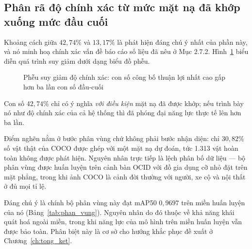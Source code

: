 \subsection{Phân rã độ chính xác từ mức mặt nạ đã khớp xuống mức đầu cuối}

Khoảng cách giữa $42{,}74\%$ và $13{,}17\%$ là phát hiện đáng chú ý nhất của phần này, và nó
minh hoạ chính xác vấn đề báo cáo số liệu đã nêu ở Mục 2.7.2. Hình~\ref{fig:phieu} biểu diễn
quá trình suy giảm dưới dạng biểu đồ phễu.

\begin{figure}[H]
\centering
{}
\caption{Phễu suy giảm độ chính xác: con số công bố thuận lợi nhất cao gấp hơn ba lần con số
đầu-cuối}
\label{fig:phieu}
\end{figure}

Con số $42{,}74\%$ chỉ có ý nghĩa \emph{với điều kiện} mặt nạ đã được khớp; nếu trình bày nó như
độ chính xác của cả hệ thống thì đã phóng đại năng lực thực tế lên hơn ba lần.

Điểm nghẽn nằm ở bước phân vùng chứ không phải bước nhận diện: chỉ $30{,}82\%$ số vật thật của
COCO được ghép với một mặt nạ dự đoán, tức 1.313 vật hoàn toàn không được phát hiện. Nguyên nhân
trực tiếp là lệch phân bố dữ liệu --- bộ phân vùng được huấn luyện trên cảnh bàn OCID với đồ gia
dụng cỡ nhỏ đặt trên mặt phẳng, trong khi ảnh COCO là cảnh đời thường với người, xe cộ và nội
thất ở đủ mọi tỉ lệ.

Đáng chú ý là chính bộ phân vùng này đạt mAP50 $0{,}9697$ trên miền huấn luyện của nó
(Bảng~\ref{tab:phan_vung}). Nguyên nhân do đó thuộc về khả năng khái quát hoá ngoài miền, trong khi năng lực của mô hình trên miền huấn luyện vẫn được bảo toàn. Phân biệt này là cơ sở cho hướng khắc phục đề xuất ở Chương~\ref{ch:tong_ket}.

